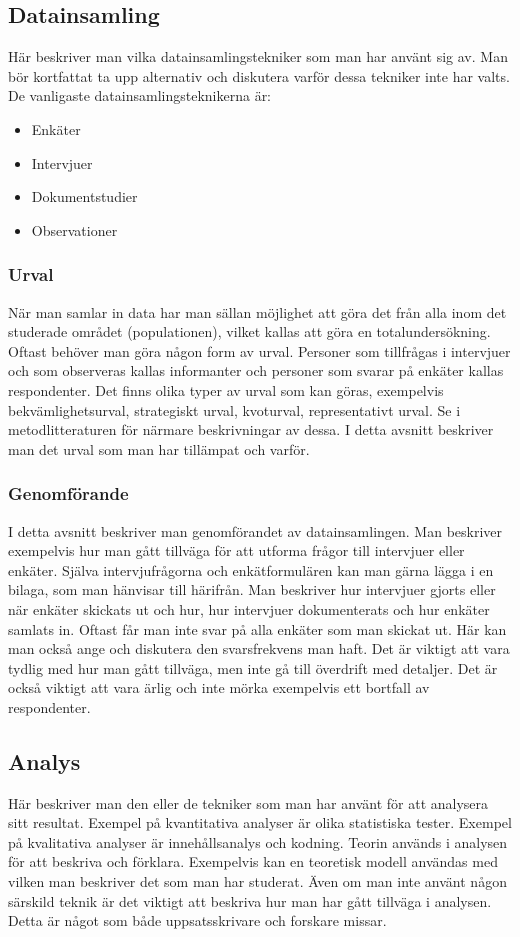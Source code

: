 \documentclass[a4paper,12pt]{article} %
\begin{document}
\subsection{Datainsamling}
Här beskriver man vilka datainsamlingstekniker som man har använt sig av. Man bör kortfattat ta upp alternativ och diskutera varför dessa tekniker inte har valts. De vanligaste datainsamlingsteknikerna är:
\begin{itemize}
\item Enkäter
\item Intervjuer
\item Dokumentstudier
\item Observationer
\end{itemize}

\subsubsection{Urval}
När man samlar in data har man sällan möjlighet att göra det från alla inom det studerade området (populationen), vilket kallas att göra en totalundersökning. Oftast behöver man göra någon form av urval. Personer som tillfrågas i intervjuer och som observeras kallas informanter och personer som svarar på enkäter kallas respondenter. Det finns olika typer av urval som kan göras, exempelvis bekvämlighetsurval, strategiskt urval, kvoturval, representativt urval. Se i metodlitteraturen för närmare beskrivningar av dessa. I detta avsnitt beskriver man det urval som man har tillämpat och varför.

\subsubsection {Genomförande}
I detta avsnitt beskriver man genomförandet av datainsamlingen. Man beskriver exempelvis hur man gått tillväga för att utforma frågor till intervjuer eller enkäter. Själva intervjufrågorna och enkätformulären kan man gärna lägga i en bilaga, som man hänvisar till härifrån. Man beskriver hur intervjuer gjorts eller när enkäter skickats ut och hur, hur intervjuer dokumenterats och hur enkäter samlats in. Oftast får man inte svar på alla enkäter som man skickat ut. Här kan man också ange och diskutera den svarsfrekvens man haft. Det är viktigt att vara tydlig med hur man gått tillväga, men inte gå till överdrift med detaljer. Det är också viktigt att vara ärlig och inte mörka exempelvis ett bortfall av respondenter.

\subsection{Analys}
Här beskriver man den eller de tekniker som man har använt för att analysera sitt resultat. Exempel på kvantitativa analyser är olika statistiska tester. Exempel på kvalitativa analyser är innehållsanalys och kodning. Teorin används i analysen för att beskriva och förklara. Exempelvis kan en teoretisk modell användas med vilken man beskriver det som man har studerat. Även om man inte använt någon särskild teknik är det viktigt att beskriva hur man har gått tillväga i analysen. Detta är något som både uppsatsskrivare och forskare missar.
\end{document}
